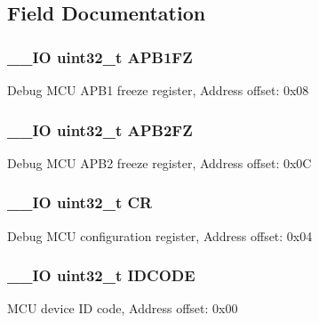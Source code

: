 \subsection{Field Documentation}
\hypertarget{struct_d_b_g_m_c_u___type_def_a5eaefc557573ae7bdc632ef6b6d574b5}{
\subsubsection[{A\-P\-B1\-F\-Z}]{\setlength{\rightskip}{0pt plus 5cm}\-\_\-\-\_\-\-I\-O uint32\-\_\-t A\-P\-B1\-F\-Z}}\label{struct_d_b_g_m_c_u___type_def_a5eaefc557573ae7bdc632ef6b6d574b5}
Debug M\-C\-U A\-P\-B1 freeze register, Address offset\-: 0x08 \hypertarget{struct_d_b_g_m_c_u___type_def_a4628a8c32f97ef93b15b2b503ef90c75}{
\subsubsection[{A\-P\-B2\-F\-Z}]{\setlength{\rightskip}{0pt plus 5cm}\-\_\-\-\_\-\-I\-O uint32\-\_\-t A\-P\-B2\-F\-Z}}\label{struct_d_b_g_m_c_u___type_def_a4628a8c32f97ef93b15b2b503ef90c75}
Debug M\-C\-U A\-P\-B2 freeze register, Address offset\-: 0x0\-C \hypertarget{struct_d_b_g_m_c_u___type_def_ab40c89c59391aaa9d9a8ec011dd0907a}{
\subsubsection[{C\-R}]{\setlength{\rightskip}{0pt plus 5cm}\-\_\-\-\_\-\-I\-O uint32\-\_\-t C\-R}}\label{struct_d_b_g_m_c_u___type_def_ab40c89c59391aaa9d9a8ec011dd0907a}
Debug M\-C\-U configuration register, Address offset\-: 0x04 \hypertarget{struct_d_b_g_m_c_u___type_def_a24df28d0e440321b21f6f07b3bb93dea}{
\subsubsection[{I\-D\-C\-O\-D\-E}]{\setlength{\rightskip}{0pt plus 5cm}\-\_\-\-\_\-\-I\-O uint32\-\_\-t I\-D\-C\-O\-D\-E}}\label{struct_d_b_g_m_c_u___type_def_a24df28d0e440321b21f6f07b3bb93dea}
M\-C\-U device I\-D code, Address offset\-: 0x00 

